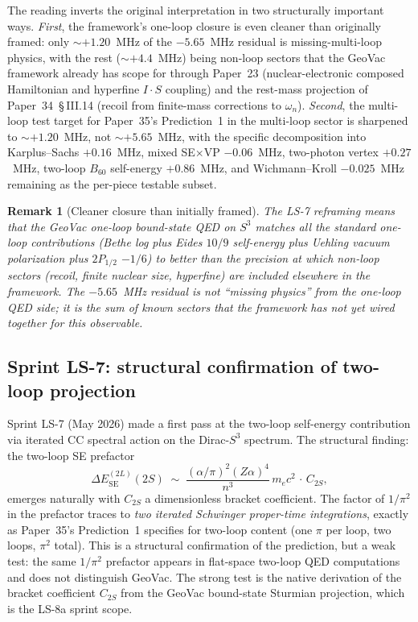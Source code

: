 \documentclass[11pt]{article}
\newtheorem{remark}{Remark}
\begin{document}
The reading inverts the original interpretation in two structurally
important ways.  \emph{First}, the framework's one-loop closure is
even cleaner than originally framed: only $\sim +1.20$~MHz of the
$-5.65$~MHz residual is missing-multi-loop physics, with the rest
($\sim +4.4$~MHz) being non-loop sectors that the GeoVac framework
already has scope for through Paper~23 (nuclear-electronic composed
Hamiltonian and hyperfine $I \cdot S$ coupling) and the rest-mass
projection of Paper~34~\S\,III.14 (recoil from finite-mass
corrections to $\omega_n$).  \emph{Second}, the multi-loop test
target for Paper~35's Prediction~1 in the multi-loop sector is
sharpened to $\sim +1.20$~MHz, not $\sim +5.65$~MHz, with the
specific decomposition into Karplus--Sachs $+0.16$~MHz, mixed
SE$\times$VP $-0.06$~MHz, two-photon vertex $+0.27$~MHz, two-loop
$B_{60}$ self-energy $+0.86$~MHz, and Wichmann--Kroll $-0.025$~MHz
remaining as the per-piece testable subset.

\begin{remark}[Cleaner closure than initially framed]
\label{rem:cleaner_closure}
The LS-7 reframing means that the GeoVac one-loop bound-state QED on
$S^3$ matches all the standard one-loop contributions (Bethe log
plus Eides $10/9$ self-energy plus Uehling vacuum polarization plus
$2P_{1/2}$ $-1/6$) to better than the precision at which non-loop
sectors (recoil, finite nuclear size, hyperfine) are included
elsewhere in the framework.  The $-5.65$~MHz residual is not
``missing physics'' from the one-loop QED side; it is the sum of
known sectors that the framework has not yet wired together for
this observable.
\end{remark}

\subsection{Sprint LS-7: structural confirmation of two-loop projection}

Sprint LS-7 (May 2026) made a first pass at the two-loop self-energy
contribution via iterated CC spectral action on the Dirac-$S^3$
spectrum.  The structural finding: the two-loop SE prefactor
\begin{equation}
\label{eq:two_loop_prefactor}
\Delta E^{(2L)}_\text{SE}(2S) \;\sim\; \frac{(\alpha/\pi)^2 (Z\alpha)^4}{n^3}\, m_e c^2 \,\cdot\, C_{2S},
\end{equation}
emerges naturally with $C_{2S}$ a dimensionless bracket coefficient.
The factor of $1/\pi^2$ in the prefactor traces to \emph{two iterated
Schwinger proper-time integrations}, exactly as Paper~35's
Prediction~1 specifies for two-loop content (one $\pi$ per loop, two
loops, $\pi^2$ total).  This is a structural confirmation of the
prediction, but a weak test: the same $1/\pi^2$ prefactor appears in
flat-space two-loop QED computations and does not distinguish
GeoVac.  The strong test is the native derivation of the bracket
coefficient $C_{2S}$ from the GeoVac bound-state Sturmian projection,
which is the LS-8a sprint scope.
\end{document}
